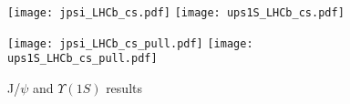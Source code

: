 \documentclass{article}
\begin{document}
\clearpage

\begin{figure}
\centering
\texttt{[image: jpsi\_LHCb\_cs.pdf]}
\texttt{[image: ups1S\_LHCb\_cs.pdf]}

\texttt{[image: jpsi\_LHCb\_cs\_pull.pdf]}
\texttt{[image: ups1S\_LHCb\_cs\_pull.pdf]}
\caption{J/$\psi$ and $\Upsilon(1S)$ results}
\end{figure}

\clearpage


\end{document}
